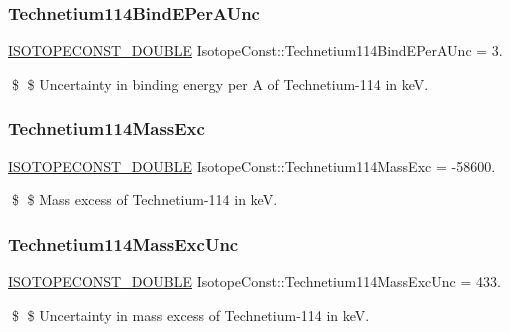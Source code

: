 \subsubsection{\texorpdfstring{Technetium114\+Bind\+E\+Per\+A\+Unc}{Technetium114BindEPerAUnc}}
{\footnotesize\ttfamily \mbox{\hyperlink{group___isotope_const-_macros_ga8f45a7272ce02c0b4c65c44636ed719a}{I\+S\+O\+T\+O\+P\+E\+C\+O\+N\+S\+T\+\_\+\+D\+O\+U\+B\+LE}} Isotope\+Const\+::\+Technetium114\+Bind\+E\+Per\+A\+Unc = 3.}

\$ \$ Uncertainty in binding energy per A of Technetium-\/114 in keV. \mbox{\label{group___isotope_const-_technetium-_tc114_gaeb326e2c68e2a5466dcaea1e2f3ff8e1}} 
\subsubsection{\texorpdfstring{Technetium114\+Mass\+Exc}{Technetium114MassExc}}
{\footnotesize\ttfamily \mbox{\hyperlink{group___isotope_const-_macros_ga8f45a7272ce02c0b4c65c44636ed719a}{I\+S\+O\+T\+O\+P\+E\+C\+O\+N\+S\+T\+\_\+\+D\+O\+U\+B\+LE}} Isotope\+Const\+::\+Technetium114\+Mass\+Exc = -\/58600.}

\$ \$ Mass excess of Technetium-\/114 in keV. \mbox{\label{group___isotope_const-_technetium-_tc114_ga093b812b44834eb498f3117b46f502d8}} 
\subsubsection{\texorpdfstring{Technetium114\+Mass\+Exc\+Unc}{Technetium114MassExcUnc}}
{\footnotesize\ttfamily \mbox{\hyperlink{group___isotope_const-_macros_ga8f45a7272ce02c0b4c65c44636ed719a}{I\+S\+O\+T\+O\+P\+E\+C\+O\+N\+S\+T\+\_\+\+D\+O\+U\+B\+LE}} Isotope\+Const\+::\+Technetium114\+Mass\+Exc\+Unc = 433.}

\$ \$ Uncertainty in mass excess of Technetium-\/114 in keV. \mbox{\label{group___isotope_const-_technetium-_tc114_ga39143a8e83b18f8f6de3d25752b7dfa7}} 
